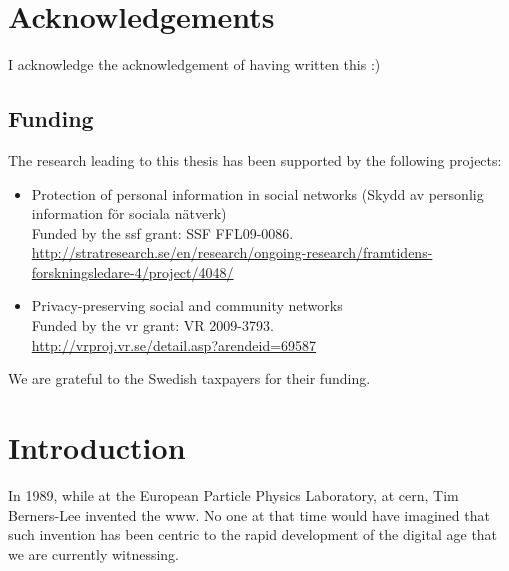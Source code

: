 \documentclass[showtrims]{kthesis}
\begin{document}
\frontmatter
% 
\clearpage
\chapter*{Acknowledgements}
I acknowledge the acknowledgement of having written this :)

\section*{Funding}
The research leading to this thesis has been supported by the following projects:
\begin{itemize}
    \item Protection of personal information in social networks (Skydd av personlig information för sociala nätverk)\\
    Funded by the \acl{ssf} grant: SSF FFL09-0086.\\
    \url{http://stratresearch.se/en/research/ongoing-research/framtidens-forskningsledare-4/project/4048/}
    \item Privacy-preserving social and community networks\\
    Funded by the \Acl{vr} grant: VR 2009-3793.\\
    \url{http://vrproj.vr.se/detail.asp?arendeid=69587}
\end{itemize}

We are grateful to the Swedish taxpayers for their funding.

\clearpage
{}
\tableofcontents
\mainmatter
\chapter{Introduction}
In 1989, while at the European Particle Physics Laboratory, at \ac{cern}, Tim Berners-Lee 
invented the \Ac{www}. No one at that time would have imagined that such invention 
has been centric to the rapid development of the digital age that we are currently 
witnessing.
\end{document}

